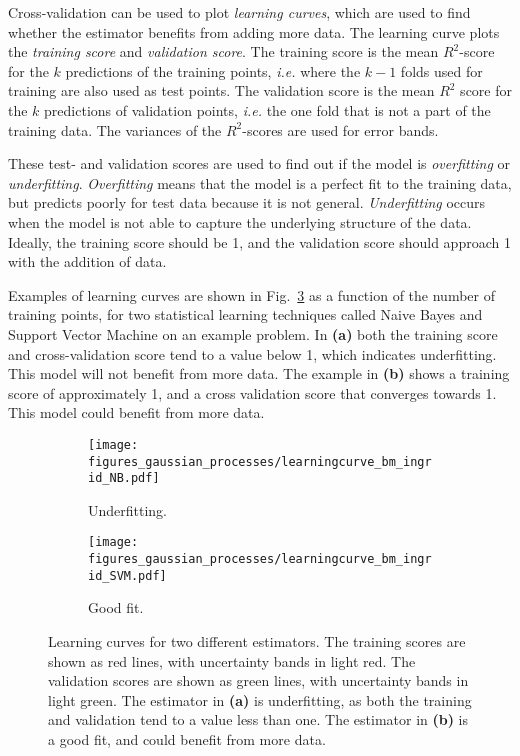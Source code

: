 \documentclass[twoside,english]{uiofysmaster}
\begin{document}
{{Cross-validation can be used to plot \textit{learning curves}, which are used to find whether the estimator benefits from adding more data. The learning curve plots the \textit{training score} and \textit{validation score}. The training score is the mean $R^2$-score for the $k$ predictions of the training points, \textit{i.e.} where the $k-1$ folds used for training are also used as test points. The validation score is the mean $R^2$ score for the $k$ predictions of validation points, \textit{i.e.} the one fold that is not a part of the training data. The variances of the $R^2$-scores are used for error bands.

These test- and validation scores are used to find out if the model is \textit{overfitting} or \textit{underfitting}. \textit{Overfitting} means that the model is a perfect fit to the training data, but predicts poorly for test data because it is not general. \textit{Underfitting} occurs when the model is not able to capture the underlying structure of the data. Ideally, the training score should be 1, and the validation score should approach 1 with the addition of data.

Examples of learning curves are shown in Fig.~\ref{Fig:: gaussian process : learning curves} as a function of the number of training points, for two statistical learning techniques called Naive Bayes and Support Vector Machine on an example problem. In \textbf{(a)} both the training score and cross-validation score tend to a value below 1, which indicates underfitting. This model will not benefit from more data. The example in \textbf{(b)} shows a training score of approximately 1, and a cross validation score that converges towards 1. This model could benefit from more data.

\begin{figure}
    \centering
    \begin{subfigure}[b]{0.45\textwidth}
        \texttt{[image: figures\_gaussian\_processes/learningcurve\_bm\_ingrid\_NB.pdf]}
        \caption{Underfitting.}
        \label{fig:gull}
    \end{subfigure}
    \begin{subfigure}[b]{0.45\textwidth}
        \texttt{[image: figures\_gaussian\_processes/learningcurve\_bm\_ingrid\_SVM.pdf]}
        \caption{Good fit.}
        \label{fig:tiger}
    \end{subfigure}
\caption{Learning curves for two different estimators. The training scores are shown as red lines, with uncertainty bands in light red. The validation scores are shown as green lines, with uncertainty bands in light green. The estimator in \textbf{(a)} is underfitting, as both the training and validation tend to a value less than one. The estimator in \textbf{(b)} is a good fit, and could benefit from more data.}
\label{Fig:: gaussian process : learning curves}
\end{figure}



}}
\end{document}
